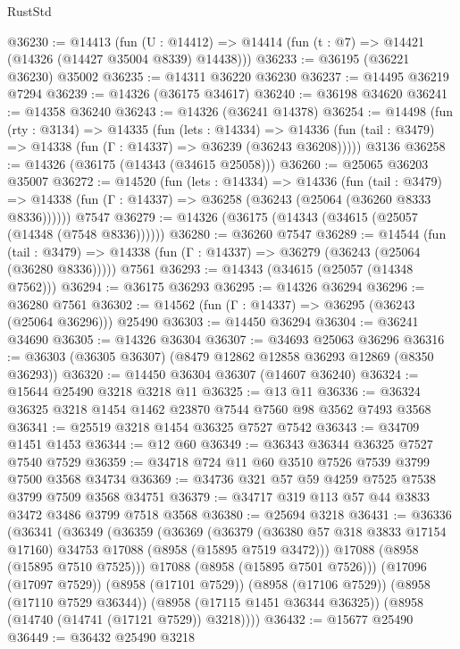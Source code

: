 \begin{lexlean}{RustStd}
\begin{coremodule}
@36230 := @14413
    (fun (U : @14412) => @14414 (fun (t : @7) => @14421 (@14326 (@14427 @35004 @8339) @14438)))
@36233 := @36195 (@36221 @36230) @35002
@36235 := @14311 @36220 @36230
@36237 := @14495 @36219 @7294
@36239 := @14326 (@36175 @34617)
@36240 := @36198 @34620
@36241 := @14358 @36240
@36243 := @14326 (@36241 @14378)
@36254 := @14498
    (fun (rty : @3134) =>
    @14335
      (fun (lets : @14334) =>
      @14336 (fun (tail : @3479) => @14338 (fun (Γ : @14337) => @36239 (@36243 @36208)))))
    @3136
@36258 := @14326 (@36175 (@14343 (@34615 @25058)))
@36260 := @25065 @36203 @35007
@36272 := @14520
    (fun (lets : @14334) =>
    @14336
      (fun (tail : @3479) =>
      @14338 (fun (Γ : @14337) => @36258 (@36243 (@25064 (@36260 @8333 @8336))))))
    @7547
@36279 := @14326 (@36175 (@14343 (@34615 (@25057 (@14348 (@7548 @8336))))))
@36280 := @36260 @7547
@36289 := @14544
    (fun (tail : @3479) => @14338 (fun (Γ : @14337) => @36279 (@36243 (@25064 (@36280 @8336)))))
    @7561
@36293 := @14343 (@34615 (@25057 (@14348 @7562)))
@36294 := @36175 @36293
@36295 := @14326 @36294
@36296 := @36280 @7561
@36302 := @14562 (fun (Γ : @14337) => @36295 (@36243 (@25064 @36296))) @25490
@36303 := @14450 @36294
@36304 := @36241 @34690
@36305 := @14326 @36304
@36307 := @34693 @25063 @36296
@36316 := @36303 (@36305 @36307) (@8479 @12862 @12858 @36293 @12869 (@8350 @36293))
@36320 := @14450 @36304 @36307 (@14607 @36240)
@36324 := @15644 @25490 @3218 @3218 @11
@36325 := @13 @11
@36336 := @36324 @36325 @3218 @1454 @1462 @23870 @7544 @7560 @98 @3562 @7493 @3568
@36341 := @25519 @3218 @1454 @36325 @7527 @7542
@36343 := @34709 @1451 @1453
@36344 := @12 @60
@36349 := @36343 @36344 @36325 @7527 @7540 @7529
@36359 := @34718 @724 @11 @60 @3510 @7526 @7539 @3799 @7500 @3568 @34734
@36369 := @34736 @321 @57 @59 @4259 @7525 @7538 @3799 @7509 @3568 @34751
@36379 := @34717 @319 @113 @57 @44 @3833 @3472 @3486 @3799 @7518 @3568
@36380 := @25694 @3218
@36431 := @36336
    (@36341
      (@36349
        (@36359
          (@36369
            (@36379
              (@36380 @57 @318 @3833 @17154 @17160)
              @34753
              @17088
              (@8958 (@15895 @7519 @3472)))
            @17088
            (@8958 (@15895 @7510 @7525)))
          @17088
          (@8958 (@15895 @7501 @7526)))
        (@17096 (@17097 @7529))
        (@8958 (@17101 @7529))
        (@8958 (@17106 @7529))
        (@8958 (@17110 @7529 @36344))
        (@8958 (@17115 @1451 @36344 @36325))
        (@8958 (@14740 (@14741 (@17121 @7529)) @3218))))
@36432 := @15677 @25490
@36449 := @36432
    @25490
    @3218

\end{coremodule}
\end{lexlean}
